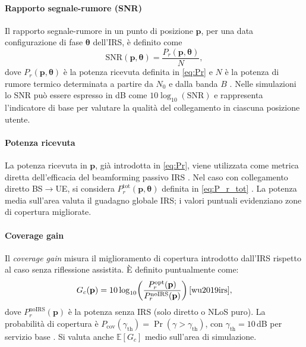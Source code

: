 \documentclass[12pt,a4paper]{report}
\begin{document}
\paragraph{Rapporto segnale-rumore (SNR)}
Il rapporto segnale-rumore in un punto di posizione $\mathbf{p}$, per
una data configurazione di fase $\boldsymbol{\theta}$ dell'IRS, è definito come
\begin{equation}
  \mathrm{SNR}(\mathbf{p}, \boldsymbol{\theta}) =
  \frac{P_r(\mathbf{p}, \boldsymbol{\theta})}{N},
  \label{eq:snr}
\end{equation}
dove $P_r(\mathbf{p}, \boldsymbol{\theta})$ è la potenza ricevuta
definita in \eqref{eq:Pr} e $N$ è la potenza di rumore termico
determinata a partire da $N_0$ e dalla banda $B$ \cite{3gpp_tr38901}.
Nelle simulazioni lo SNR può essere espresso in dB come
$10\log_{10}(\mathrm{SNR})$ e rappresenta l'indicatore di base per
valutare la qualità del collegamento in ciascuna posizione utente.

\paragraph{Potenza ricevuta}
La potenza ricevuta in $\mathbf{p}$, già introdotta in \eqref{eq:Pr},
viene utilizzata come metrica diretta dell'efficacia del beamforming
passivo IRS \cite{wu2019irs}. Nel caso con collegamento diretto
BS$\rightarrow$UE, si considera $P_r^{\text{tot}}(\mathbf{p},
\boldsymbol{\theta})$ definita in \eqref{eq:P_r_tot}
\cite{guo2021cascaded}. La potenza media sull'area valuta il guadagno
globale IRS; i valori puntuali evidenziano zone di copertura
migliorate.

\paragraph{Coverage gain}
Il \textit{coverage gain} misura il miglioramento di copertura
introdotto dall'IRS rispetto al caso senza riflessione assistita. È
definito puntualmente come:
\begin{equation}
  G_c(\mathbf{p}) =
  10\log_{10}\!\left(
    \frac{P_r^{\mathrm{opt}}(\mathbf{p})}{P_r^{\mathrm{noIRS}}(\mathbf{p})}
  \right) \cite{wu2019irs},
  \label{eq:coverage_gain}
\end{equation}
dove $P_r^{\mathrm{noIRS}}(\mathbf{p})$ è la potenza senza IRS (solo
diretto o NLoS puro). La probabilità di copertura è
$P_{\mathrm{cov}}(\gamma_{\mathrm{th}}) = \Pr(\gamma >
\gamma_{\mathrm{th}})$, con $\gamma_{\mathrm{th}}=10\,$dB per
servizio base \cite{3gpp_tr38857}. Si valuta anche $\mathbb{E}[G_c]$
medio sull'area di simulazione.
\end{document}

